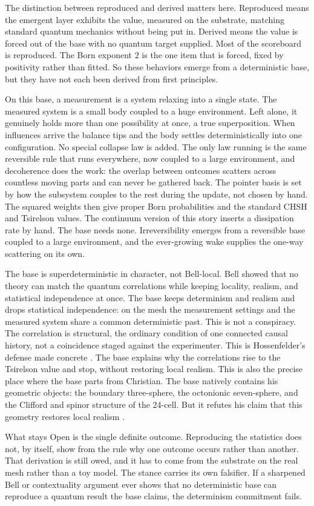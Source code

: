 The distinction between reproduced and derived matters here. Reproduced means the emergent layer exhibits the
value, measured on the substrate, matching standard quantum mechanics without
being put in. Derived means the value is forced out of the base with no quantum
target supplied. Most of the scoreboard is reproduced. The Born exponent $2$ is
the one item that is forced, fixed by positivity rather than fitted. So these
behaviors emerge from a deterministic base, but they
have not each been derived from first principles.

On this base, a measurement is a system relaxing into a single state. The
measured system is a small body coupled to a huge environment. Left alone, it
genuinely holds more than one possibility at once, a true superposition. When
influences arrive the balance tips and the body settles deterministically into
one configuration. No special collapse law is
added. The only law running is the same reversible rule that runs everywhere,
now coupled to a large environment, and decoherence does the work: the overlap
between outcomes scatters across countless moving parts and can never be gathered
back. The pointer basis is set by how the subsystem couples to the rest during
the update, not chosen by hand. The squared weights then give proper Born
probabilities and the standard CHSH and Tsirelson values. The continuum version
of this story inserts a dissipation rate by hand. The base needs none.
Irreversibility emerges from a reversible base coupled to a large environment, and
the ever-growing wake supplies the one-way scattering on its own.

The base is superdeterministic in character, not Bell-local. Bell showed that no
theory can match the quantum correlations while keeping locality, realism, and
statistical independence at once. The base keeps determinism and realism and
drops statistical independence: on the mesh the measurement settings and the
measured system share a common deterministic past. This is not a conspiracy. The
correlation is structural, the ordinary condition of one connected causal history,
not a coincidence staged against the experimenter. This is Hossenfelder's
defense made concrete \cite{hossenfelder2020}. The base explains why the
correlations rise to the Tsirelson value and stop, without restoring local
realism. This is also the precise place where the base parts from Christian. The base
natively contains his geometric objects: the boundary three-sphere, the octonionic
seven-sphere, and the Clifford and spinor structure of the 24-cell. But it refutes
his claim that this geometry restores local realism \cite{christian2007}.

What stays Open is the single definite outcome. Reproducing the statistics does
not, by itself, show from the rule why one outcome occurs rather than another.
That derivation is still owed, and it has to come from the substrate on the real
mesh rather than a toy model. The stance carries its own falsifier. If a
sharpened Bell or contextuality argument ever shows that no deterministic base
can reproduce a quantum result the base claims, the determinism commitment fails.
